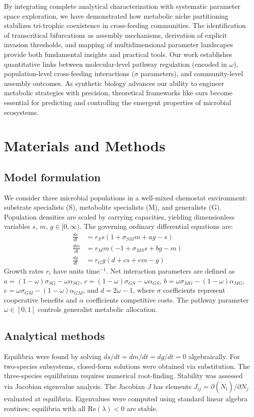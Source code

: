 \documentclass[9pt,twocolumn]{pnas-new}
\begin{document}
By integrating complete analytical characterization with systematic parameter space exploration, we have demonstrated how metabolic niche partitioning stabilizes tri-trophic coexistence in cross-feeding communities. The identification of transcritical bifurcations as assembly mechanisms, derivation of explicit invasion thresholds, and mapping of multidimensional parameter landscapes provide both fundamental insights and practical tools. Our work establishes quantitative links between molecular-level pathway regulation (encoded in $\omega$), population-level cross-feeding interactions ($\sigma$ parameters), and community-level assembly outcomes. As synthetic biology advances our ability to engineer metabolic strategies with precision, theoretical frameworks like ours become essential for predicting and controlling the emergent properties of microbial ecosystems.

\section*{Materials and Methods}

\subsection*{Model formulation} We consider three microbial populations in a well-mixed chemostat environment: substrate specialists (S), metabolite specialists (M), and generalists (G). Population densities are scaled by carrying capacities, yielding dimensionless variables $s$, $m$, $g \in [0, \infty)$. The governing ordinary differential equations are:
\begin{align}
\frac{ds}{dt} &= r_S s(1 + \sigma_{SM} m + a g - s)\\
\frac{dm}{dt} &= r_M m(-1 + \sigma_{MS} s + b g - m)\\
\frac{dg}{dt} &= r_G g(d + c s + e m - g)
\end{align}
Growth rates $r_i$ have units time$^{-1}$. Net interaction parameters are defined as $a = (1-\omega)\sigma_{SG} - \omega\alpha_{SG}$, $c = (1-\omega)\sigma_{GS} - \omega\alpha_{GS}$, $b = \omega\sigma_{MG} - (1-\omega)\alpha_{MG}$, $e = \omega\sigma_{GM} - (1-\omega)\alpha_{GM}$, and $d = 2\omega - 1$, where $\sigma$ coefficients represent cooperative benefits and $\alpha$ coefficients competitive costs. The pathway parameter $\omega \in [0,1]$ controls generalist metabolic allocation.

\subsection*{Analytical methods} Equilibria were found by solving $ds/dt = dm/dt = dg/dt = 0$ algebraically. For two-species subsystems, closed-form solutions were obtained via substitution. The three-species equilibrium requires numerical root-finding. Stability was assessed via Jacobian eigenvalue analysis. The Jacobian $J$ has elements $J_{ij} = \partial(\dot{N}_i)/\partial N_j$ evaluated at equilibria. Eigenvalues were computed using standard linear algebra routines; equilibria with all $\text{Re}(\lambda) < 0$ are stable.
\end{document}
